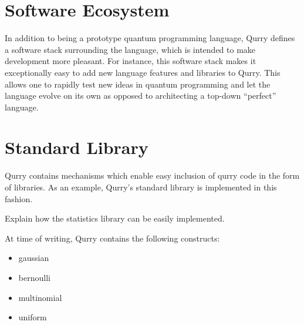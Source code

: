 \documentclass[a4paper,twocolumn,11pt,accepted=2017-05-09]{quantumarticle}
\begin{document}
%  
%  

\section{Software Ecosystem}

In addition to being a prototype quantum programming language, Qurry defines a software stack surrounding the language, which is intended to make development more pleasant.
For instance, this software stack makes it exceptionally easy to add new language features and libraries to Qurry.
This allows one to rapidly test new ideas in quantum programming and let the language evolve on its own as opposed to architecting a top-down ``perfect'' language.

\section{Standard Library}

    Qurry contains mechanisms which enable easy inclusion of qurry code in the form of libraries.
    As an example, Qurry's standard library is implemented in this fashion.

    Explain how the statistics library can be easily implemented.

    At time of writing, Qurry contains the following constructs:  	
    \begin{itemize}
	    \item gaussian 	
        \item bernoulli
	    \item multinomial 	
	    \item uniform
    \end{itemize}
\end{document}
